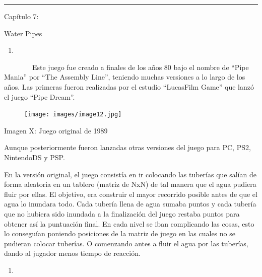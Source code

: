 \begin{center}\rule{3in}{0.4pt}\end{center}

Capítulo 7:

Water Pipes

\begin{enumerate}
\def\labelenumi{\arabic{enumi}.}
\item
\end{enumerate}

~~~~~~~~Este juego fue creado a finales de los años 80 bajo el nombre de
``Pipe Mania'' por ``The Assembly Line'', teniendo muchas versiones a lo
largo de los años. Las primeras fueron realizadas por el estudio
``LucasFilm Game'' que lanzó el juego ``Pipe Dream''.

\begin{figure}[htbp]
\centering
\texttt{[image: images/image12.jpg]}
\end{figure}

Imagen X: Juego original de 1989

Aunque posteriormente fueron lanzadas otras versiones del juego para PC,
PS2, NintendoDS y PSP.

En la versión original, el juego consistía en ir colocando las tuberías
que salían de forma aleatoria en un tablero (matriz de NxN) de tal
manera que el agua pudiera fluir por ellas. El objetivo, era construir
el mayor recorrido posible antes de que el agua lo inundara todo. Cada
tubería llena de agua sumaba puntos y cada tubería que no hubiera sido
inundada a la finalización del juego restaba puntos para obtener así la
puntuación final. En cada nivel se iban complicando las cosas, esto lo
conseguían poniendo posiciones de la matriz de juego en las cuales no se
pudieran colocar tuberías. O comenzando antes a fluir el agua por las
tuberías, dando al jugador menos tiempo de reacción.

\begin{enumerate}
\def\labelenumi{\arabic{enumi}.}
\setcounter{enumi}{1}
\item
\end{enumerate}

